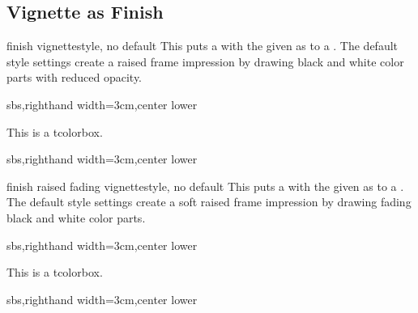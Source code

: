 \clearpage
\subsection{Vignette as Finish}\label{subsec:vignettefinish}


\begin{docTcbKey}[][doc new=2016-04-22]{finish vignette}{}{style, no default}
  This puts a  with the given 
  as  to a .
  The default style settings create a raised frame impression by
  drawing black and white color parts with reduced opacity.

\begin{dispExample*}{sbs,righthand width=3cm,center lower}
\begin{tcolorbox}[enhanced,size=small,
  colback=green!10,colframe=green!50!black,
  boxrule=0.5mm,titlerule=0mm,
  title=My title,center title,fonttitle=\bfseries,
  finish vignette={size=1mm}]
    This is a tcolorbox.
\end{tcolorbox}
\end{dispExample*}

\begin{dispExample*}{sbs,righthand width=3cm,center lower}
\end{dispExample*}
\end{docTcbKey}


\begin{docTcbKey}[][doc new=2016-04-22]{finish raised fading vignette}{}{style, no default}
  This puts a  with the given 
  as  to a .
  The default style settings create a soft raised frame impression by
  drawing fading black and white color parts.

\begin{dispExample*}{sbs,righthand width=3cm,center lower}
\begin{tcolorbox}[enhanced,size=small,
  colback=green!10,colframe=green!50!black,
  boxrule=0.5mm,titlerule=0mm,
  title=My title,center title,fonttitle=\bfseries,
  finish raised fading vignette={size=1mm}]
    This is a tcolorbox.
\end{tcolorbox}
\end{dispExample*}

\begin{dispExample*}{sbs,righthand width=3cm,center lower}
\end{dispExample*}

\end{docTcbKey}



